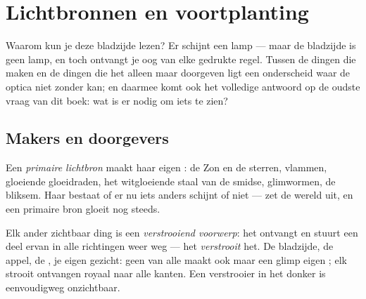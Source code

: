\chapter{Lichtbronnen en voortplanting}\label{ch:g7:light-sources-propagation}

Waarom kun je deze bladzijde lezen? Er schijnt een lamp --- maar de
bladzijde is geen lamp, en toch ontvangt je oog  van elke
gedrukte regel. Tussen de dingen die  maken en de dingen die het
alleen maar doorgeven ligt een onderscheid waar de optica niet zonder
kan; en daarmee komt ook het volledige antwoord op de oudste vraag van
dit boek: wat is er nodig om iets te zien?

\section{Makers en doorgevers}

\begin{definition}\label{def:g7:light-sources-propagation:primary}
Een \emph{primaire lichtbron} maakt haar
eigen : de Zon en de sterren, vlammen, gloeiende
gloeidraden, het witgloeiende staal van de smidse, glimwormen, de
bliksem. Haar  bestaat of er nu iets anders schijnt of niet ---
zet de wereld uit, en een primaire bron gloeit nog steeds.
\end{definition}

\begin{definition}\label{def:g7:light-sources-propagation:diffusion}
Elk ander zichtbaar ding is een \emph{verstrooiend
voorwerp}: het ontvangt  en stuurt een deel
ervan in alle richtingen weer weg --- het \emph{verstrooit} het. De
bladzijde, de appel, de , je eigen gezicht: geen van alle maakt
ook maar een glimp eigen ; elk strooit ontvangen 
royaal naar alle kanten. Een verstrooier in het donker is eenvoudigweg
onzichtbaar.
\end{definition}

